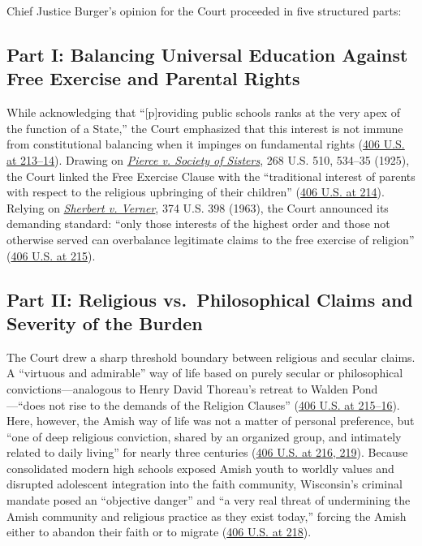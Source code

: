 \documentclass[12pt]{article}
\begin{document}
Chief Justice Burger's opinion for the Court proceeded in five structured parts:

\subsection{Part I: Balancing Universal Education Against Free Exercise and Parental Rights}

While acknowledging that ``[p]roviding public schools ranks at the very apex of the function of a State,'' the Court emphasized that this interest is not immune from constitutional balancing when it impinges on fundamental rights (\href{https://supreme.justia.com/cases/federal/us/406/205/}{406 U.S. at 213--14}). Drawing on \href{https://supreme.justia.com/cases/federal/us/268/510/}{\emph{Pierce v. Society of Sisters}}, 268 U.S. 510, 534--35 (1925), the Court linked the Free Exercise Clause with the ``traditional interest of parents with respect to the religious upbringing of their children'' (\href{https://supreme.justia.com/cases/federal/us/406/205/}{406 U.S. at 214}). Relying on \href{https://supreme.justia.com/cases/federal/us/374/398/}{\emph{Sherbert v. Verner}}, 374 U.S. 398 (1963), the Court announced its demanding standard: ``only those interests of the highest order and those not otherwise served can overbalance legitimate claims to the free exercise of religion'' (\href{https://supreme.justia.com/cases/federal/us/406/205/}{406 U.S. at 215}).

\subsection{Part II: Religious vs.\ Philosophical Claims and Severity of the Burden}

The Court drew a sharp threshold boundary between religious and secular claims. A ``virtuous and admirable'' way of life based on purely secular or philosophical convictions---analogous to Henry David Thoreau's retreat to Walden Pond---``does not rise to the demands of the Religion Clauses'' (\href{https://supreme.justia.com/cases/federal/us/406/205/}{406 U.S. at 215--16}). Here, however, the Amish way of life was not a matter of personal preference, but ``one of deep religious conviction, shared by an organized group, and intimately related to daily living'' for nearly three centuries (\href{https://supreme.justia.com/cases/federal/us/406/205/}{406 U.S. at 216, 219}). Because consolidated modern high schools exposed Amish youth to worldly values and disrupted adolescent integration into the faith community, Wisconsin's criminal mandate posed an ``objective danger'' and ``a very real threat of undermining the Amish community and religious practice as they exist today,'' forcing the Amish either to abandon their faith or to migrate (\href{https://supreme.justia.com/cases/federal/us/406/205/}{406 U.S. at 218}).
\end{document}
